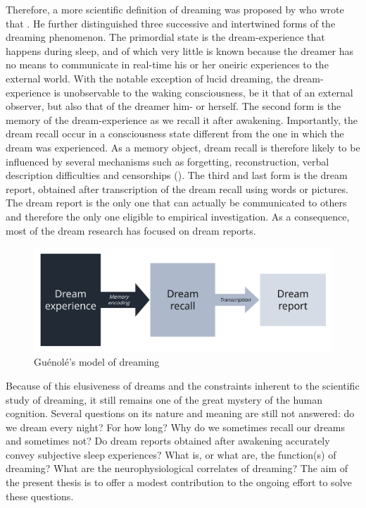 Therefore, a more scientific definition of dreaming was proposed by \citet{guenole_a_2009} who wrote that . He further distinguished three successive and intertwined forms of the dreaming phenomenon. The primordial state is the dream-experience that happens during sleep, and of which very little is known because the dreamer has no means to communicate in real-time his or her oneiric experiences to the external world. With the notable exception of lucid dreaming, the dream-experience is unobservable to the waking consciousness, be it that of an external observer, but also that of the dreamer him- or herself. The second form is the memory of the dream-experience as we recall it after awakening. Importantly, the dream recall occur in a consciousness state different from the one in which the dream was experienced. As a memory object, dream recall is therefore likely to be influenced by several mechanisms such as forgetting, reconstruction, verbal description difficulties and censorships (\cite{schwartz_sleep_2002, schwartz_dreaming:_2005}). The third and last form is the dream report, obtained after transcription of the dream recall using words or pictures. The dream report is the only one that can actually be communicated to others and therefore the only one eligible to empirical investigation. As a consequence, most of the dream research has focused on dream reports.

\begin{figure}[htb]
	\includegraphics[width=\textwidth]{Fig/Intro/Intro_Guenole/Intro_Guenole.png}
	\caption[Guénolé's model of dreaming]{Guénolé's model of dreaming}
	\label{fig:intro:guenole}
\end{figure}

Because of this elusiveness of dreams and the constraints inherent to the scientific study of dreaming, it still remains one of the great mystery of the human cognition. Several questions on its nature and meaning are still not answered: do we dream every night? For how long? Why do we sometimes recall our dreams and sometimes not? Do dream reports obtained after awakening accurately convey subjective sleep experiences? What is, or what are, the function(s) of dreaming? What are the neurophysiological correlates of dreaming? The aim of the present thesis is to offer a modest contribution to the ongoing effort to solve these questions.

